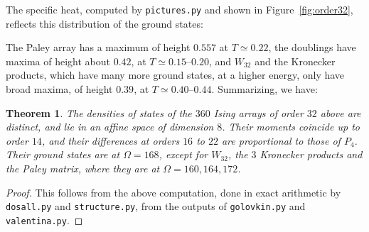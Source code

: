 \documentclass[11pt,a4paper]{article}
\newtheorem{thm}{Theorem}[section]
\theoremstyle{remark}
\begin{document}
The specific heat, computed by \texttt{pictures.py} and shown in Figure~\ref{fig:order32}, reflects this distribution of the ground states:

The Paley array has a maximum of height $0.557$ at $T\simeq0.22$, the doublings have maxima of height about $0.42$, at $T\simeq0.15$--$0.20$, and $W_{32}$ and the Kronecker products, which have many more ground states, at a higher energy, only have broad maxima, of height $0.39$, at $T\simeq0.40$--$0.44$. Summarizing, we have:

\begin{samepage}
\begin{thm}\label{thm:order32}
The densities of states of the $360$ Ising arrays of order $32$ above are distinct, and lie in an affine space of dimension $8$. Their moments coincide up to order $14$, and their differences at orders $16$ to $22$ are proportional to those of $P_4$. Their ground states are at $\Omega=168$, except for $W_{32}$, the $3$ Kronecker products and the Paley matrix, where they are at $\Omega=160,164,172$.
\end{thm}
\end{samepage}

\begin{proof}
This follows from the above computation, done in exact arithmetic by \texttt{dosall.py} and \texttt{structure.py}, from the outputs of \texttt{golovkin.py} and \texttt{valentina.py}.
\end{proof}

\medskip
\end{document}
